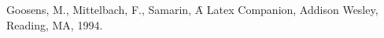 \begin{thebibliography}{100}
\setlength{\itemindent}{-1cm}

     Goosens, M., Mittelbach, F., Samarin, \f{A Latex Companion}, Addison Wesley, Reading, MA, 1994.

\end{thebibliography}
